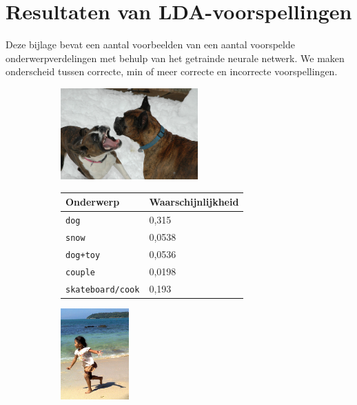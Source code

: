 \chapter{Resultaten van LDA-voorspellingen}
\label{app:LDApredictions}
Deze bijlage bevat een aantal voorbeelden van een aantal voorspelde onderwerpverdelingen met behulp van het getrainde neurale netwerk. We maken onderscheid tussen correcte, min of meer correcte en incorrecte voorspellingen.
\newpage
\begin{figure}
\begin{subfigure}{\textwidth}
    \centering
    \begin{minipage}[t][3.5cm]{.5\linewidth}
    \centering
    \vspace{0pt}
    \includegraphics[height=3.5cm]{Images/LDA/3348384389.jpg}
    \end{minipage}\hfill
    \begin{minipage}[t]{.5\textwidth}
    \centering
    \vspace{0pt}
    \begin{tabular}{ll}
            Onderwerp                           & Waarschijnlijkheid\\
            \hline
            \texttt{dog}             & 0,315 \\
            \texttt{snow}                   & 0,0538 \\
            \texttt{dog+toy} & 0,0536\\
            \texttt{couple}                  & 0,0198 \\
            \texttt{skateboard/cook}           & 0,193 \\
            \hline
        \end{tabular}
    \end{minipage}
\end{subfigure}
\vspace*{4mm}
\begin{subfigure}{\textwidth}
    \centering
    \begin{minipage}[t][3.5cm]{.5\linewidth}
    \centering
    \vspace{0pt}
    \includegraphics[height=3.5cm]{Images/LDA/3107059919.jpg}

\end{minipage}
\end{subfigure}
\end{figure}
